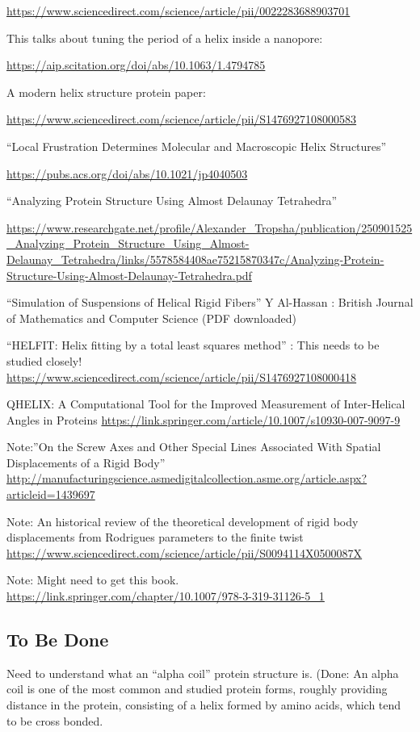 \documentclass[11pt]{article}
\begin{document}
{\url{https://www.sciencedirect.com/science/article/pii/0022283688903701}

This talks about tuning the period of a helix inside a nanopore:

\url{https://aip.scitation.org/doi/abs/10.1063/1.4794785}

A modern helix structure protein paper:

\url{https://www.sciencedirect.com/science/article/pii/S1476927108000583}

``Local Frustration Determines Molecular and Macroscopic Helix Structures''

\url{https://pubs.acs.org/doi/abs/10.1021/jp4040503}

``Analyzing Protein Structure Using Almost Delaunay Tetrahedra''

\url{https://www.researchgate.net/profile/Alexander_Tropsha/publication/250901525_Analyzing_Protein_Structure_Using_Almost-Delaunay_Tetrahedra/links/5578584408ae75215870347c/Analyzing-Protein-Structure-Using-Almost-Delaunay-Tetrahedra.pdf}

``Simulation of Suspensions of Helical Rigid Fibers'' Y Al-Hassan : British Journal of Mathematics and Computer Science
(PDF downloaded)

``HELFIT: Helix fitting by a total least squares method'' : This needs to be studied closely!
\url{https://www.sciencedirect.com/science/article/pii/S1476927108000418}

QHELIX: A Computational Tool for the Improved Measurement of Inter-Helical Angles in Proteins
\url{https://link.springer.com/article/10.1007/s10930-007-9097-9}

Note:''On the Screw Axes and Other Special Lines Associated With Spatial Displacements of a Rigid Body''
\url{http://manufacturingscience.asmedigitalcollection.asme.org/article.aspx?articleid=1439697}

Note: An historical review of the theoretical development of rigid body displacements from Rodrigues parameters to the finite twist
\url{https://www.sciencedirect.com/science/article/pii/S0094114X0500087X}

Note: Might need to get this book.
\url{https://link.springer.com/chapter/10.1007/978-3-319-31126-5_1}

\subsection{To Be Done}

Need to understand what an ``alpha coil'' protein structure is. (Done: An alpha coil is one of the most common
and studied protein forms, roughly providing distance in the protein, consisting of a helix formed by
amino acids, which tend to be cross bonded.

}
\end{document}
